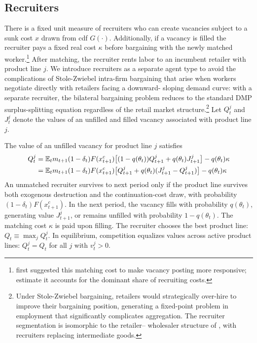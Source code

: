 \documentclass[authoryear, review, 12pt]{elsarticle}
\begin{document}
	\subsection{Recruiters}
	\label{sec:recruiters}
	
	There is a fixed unit measure of recruiters who can create 
	vacancies subject to a sunk cost $x$ drawn from cdf $G(\cdot)$. 
	Additionally, if a vacancy is filled the recruiter pays a fixed 
	real cost $\kappa$ before bargaining with the newly matched 
	worker.\footnote{\citet{pissarides_2009} first suggested this 
		matching cost to make vacancy posting more responsive; 
		\citet{christiano_2016} estimate it accounts for the dominant 
		share of recruiting costs.} After matching, the recruiter rents 
	labor to an incumbent retailer with product line $j$. We 
	introduce recruiters as a separate agent type to avoid the 
	complications of Stole-Zwiebel intra-firm bargaining that arise 
	when workers negotiate directly with retailers facing a downward-
	sloping demand curve: with a separate recruiter, the bilateral 
	bargaining problem reduces to the standard DMP surplus-splitting 
	equation regardless of the retail market structure.\footnote{Under 
		Stole-Zwiebel bargaining, retailers would strategically over-hire 
		to improve their bargaining position, generating a fixed-point 
		problem in employment that significantly complicates aggregation. 
		The recruiter segmentation is isomorphic to the retailer--
		wholesaler structure of \citet{christiano_2016}, with recruiters 
		replacing intermediate goods.} Let $Q_t^j$ and $J_t^j$ denote 
	the values of an unfilled and filled vacancy associated with 
	product line $j$.
	
	The value of an unfilled vacancy for product line $j$ satisfies
	\begin{align}\label{eq:value_recruiter_unmatched}
		Q_{t}^j &= \mathbb{E}_t m_{t+1}(1-\delta_t)F(x_{t+1}^c)
		\bigl[(1-q(\theta_t))Q_{t+1}^j
		+q(\theta_{t})J_{t+1}^j\bigr]-q(\theta_t)\kappa \notag \\
		&= \mathbb{E}_t m_{t+1}(1-\delta_t)F(x_{t+1}^c)
		\bigl[Q_{t+1}^j+q(\theta_t)
		(J_{t+1}^j-Q_{t+1}^j)\bigr]-q(\theta_t)\kappa
	\end{align}
	An unmatched recruiter survives to next period only if the 
	product line survives both exogenous destruction and the 
	continuation-cost draw, with probability $(1-\delta_t)F(x_{t+1}^c)$. 
	In the next period, the vacancy fills with probability 
	$q(\theta_t)$, generating value $J_{t+1}^j$, or remains unfilled 
	with probability $1-q(\theta_t)$. The matching cost $\kappa$ 
	is paid upon filling. The recruiter chooses the best product 
	line: $Q_t\equiv\max_j Q_t^j$. In equilibrium, competition 
	equalizes values across active product lines: $Q_t^j=Q_t$ for 
	all $j$ with $v_t^j>0$.
	
\end{document}
